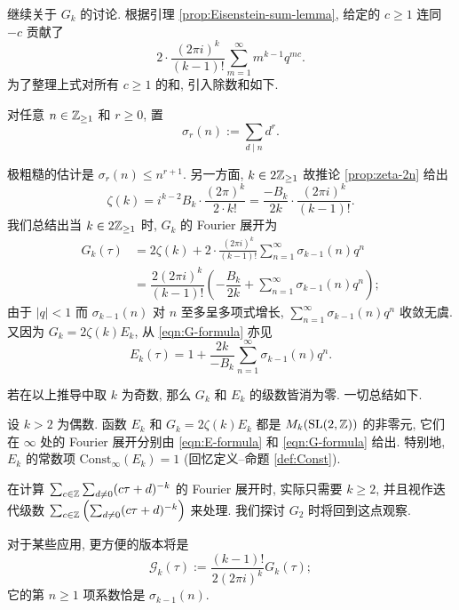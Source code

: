 继续关于 $G_k$ 的讨论. 根据引理 \ref{prop:Eisenstein-sum-lemma}, 给定的 $c \geq 1$ 连同 $-c$ 贡献了
\[ 2 \cdot \frac{(2\pi i)^k}{(k-1)!} \sum_{m=1}^\infty m^{k-1} q^{mc}. \]
为了整理上式对所有 $c \geq 1$ 的和, 引入除数和如下.
\begin{definition}\label{def:sigma-function} 
	对任意 $n \in \mathbb{Z}_{\geq 1}$ 和 $r \geq 0$, 置
	\[ \sigma_r(n) := \sum_{d \mid n} d^r. \]
\end{definition}
极粗糙的估计是 $\sigma_r(n) \leq n^{r+1}$. 另一方面, $k \in 2\mathbb{Z}_{\geq 1}$ 故推论 \ref{prop:zeta-2n} 给出
\[ \zeta(k) = i^{k-2} B_k \cdot \frac{(2\pi)^k}{2 \cdot k!} = \frac{-B_k}{2k} \cdot \frac{(2\pi i)^k}{(k-1)!}. \]
我们总结出当 $k \in 2\mathbb{Z}_{\geq 1}$ 时, $G_k$ 的 Fourier 展开为
\begin{equation}\label{eqn:G-formula}\begin{aligned}
	G_k(\tau) & = 2\zeta(k) + 2 \cdot \frac{(2\pi i)^k}{(k-1)!} \sum_{n=1}^\infty \sigma_{k-1}(n) q^n \\
	& = \dfrac{2(2\pi i)^k}{(k-1)!} \left( -\dfrac{B_k}{2k} + \sum_{n=1}^\infty \sigma_{k-1}(n) q^n \right);
\end{aligned}\end{equation}
由于 $|q| < 1$ 而 $\sigma_{k-1}(n)$ 对 $n$ 至多呈多项式增长, $\sum_{n=1}^\infty \sigma_{k-1}(n) q^n$ 收敛无虞. 又因为 $G_k = 2\zeta(k) E_k $, 从 \eqref{eqn:G-formula} 亦见
\begin{equation}\label{eqn:E-formula}
	E_k(\tau) = 1 + \dfrac{2k}{-B_k} \sum_{n=1}^\infty \sigma_{k-1}(n) q^n.
\end{equation}

若在以上推导中取 $k$ 为奇数, 那么 $G_k$ 和 $E_k$ 的级数皆消为零. 一切总结如下.
\begin{theorem}
	设 $k > 2$ 为偶数. 函数 $E_k$ 和 $G_k = 2\zeta(k) E_k$ 都是 $M_k(\operatorname{SL}(2, \mathbb{Z}))$ 的非零元, 它们在 $\infty$ 处的 Fourier 展开分别由 \eqref{eqn:E-formula} 和 \eqref{eqn:G-formula} 给出. 特别地, $E_k$ 的常数项 $\text{Const}_\infty(E_k) = 1$ (回忆定义--命题 \ref{def:Const}).
\end{theorem}

\begin{remark}\label{rem:G2-computation}
	在计算 $\sum_{c \in \mathbb{Z}} \sum_{d \neq 0} (c\tau + d)^{-k}$ 的 Fourier 展开时, 实际只需要 $k \geq 2$, 并且视作迭代级数 $\sum_{c \in \mathbb{Z}} \left( \sum_{d \neq 0} (c\tau + d)^{-k} \right)$ 来处理. 我们探讨 $G_2$ 时将回到这点观察.
\end{remark}

\begin{convention}\label{conv:new-G} 
	对于某些应用, 更方便的版本将是
	\[ \mathcal{G}_k(\tau) := \frac{(k-1)!}{2 (2\pi i)^k} G_k(\tau); \]
	它的第 $n \geq 1$ 项系数恰是 $\sigma_{k-1}(n)$.
\end{convention}

